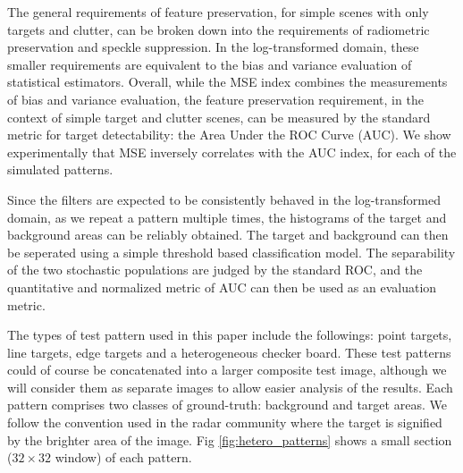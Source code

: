The general requirements of feature preservation, for simple scenes with only targets and clutter, can be broken 
down into the requirements of radiometric preservation and speckle suppression.
In the log-transformed domain, these smaller requirements are equivalent to the bias and variance evaluation of 
statistical estimators.
Overall, while the MSE index combines the measurements of bias and variance evaluation, 
	the feature preservation requirement, in the context of simple target and clutter scenes, can be measured by 
	the standard metric for target detectability: the Area Under the ROC Curve (AUC).
We show experimentally that MSE inversely correlates with the AUC index, for each of the simulated patterns.

Since the filters are expected to be consistently behaved in the log-transformed domain, as we repeat a pattern 
multiple times, the histograms of the target and background areas can be reliably obtained.
The target and background can then be seperated using a simple threshold based classification model.
The separability of the two stochastic populations are judged by the standard ROC, 
	and the quantitative and normalized metric of AUC can then be used as an evaluation metric.

The types of test pattern used in this paper include the followings:
  point targets, line targets, edge targets and a heterogeneous checker board. 
These test patterns could of course be concatenated into a larger composite test image, 
although we will consider them as separate images to allow easier analysis of the results.
Each pattern comprises two classes of ground-truth: background and target areas. We follow the convention used in the 
radar community where the target is signified by the brighter area of the image. 
Fig \ref{fig:hetero_patterns} shows a small section ($32 \times 32$ window) of each pattern.

